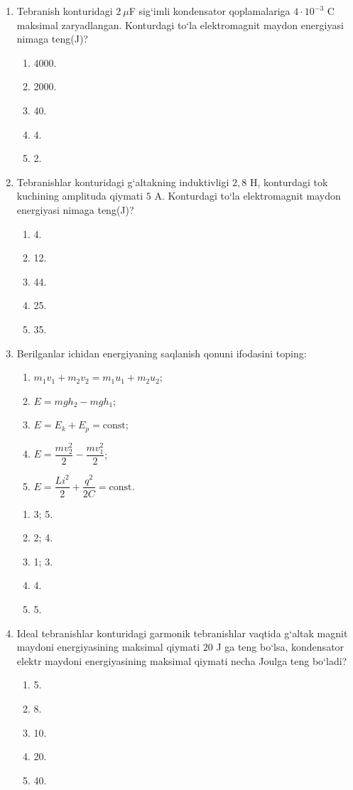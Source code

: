 \begin{enumerate}
\item Tebranish konturidagi $2~\mu$F sig‘imli kondensator qoplamalariga $4\cdot10^{-3}$ C maksimal zaryadlangan. Konturdagi to‘la elektromagnit maydon energiyasi nimaga teng(J)?
\begin{enumerate}[label=\Alph*)]
\item 4000.
\item 2000.
\item 40.
\item 4.
\item 2.
\end{enumerate}

\item Tebranishlar konturidagi g‘altakning induktivligi $2,8$ H, konturdagi tok kuchining amplituda qiymati $5$ A. Konturdagi to‘la elektromagnit maydon energiyasi nimaga teng(J)?
\begin{enumerate}[label=\Alph*)]
\item 4.
\item 12.
\item 44.
\item 25.
\item 35.
\end{enumerate}

\item Berilganlar ichidan energiyaning saqlanish qonuni ifodasini toping:
\begin{enumerate}
\item $m_1v_1+m_2v_2=m_1u_1+m_2u_2$;
\item $E=mgh_2-mgh_1$;
\item $E=E_k+E_p=\mathrm{const}$;
\item $E=\dfrac{mv_2^2}{2}-\dfrac{mv_1^2}{2}$;
\item $E=\dfrac{Li^2}{2}+\dfrac{q^2}{2C}=\mathrm{const}$.
\end{enumerate}
\begin{enumerate}[label=\Alph*)]
\item 3; 5.
\item 2; 4.
\item 1; 3.
\item 4.
\item 5.
\end{enumerate}

\item Ideal tebranishlar konturidagi garmonik tebranishlar vaqtida g‘altak magnit maydoni energiyasining maksimal qiymati $20$ J ga teng bo‘lsa, kondensator elektr maydoni energiyasining maksimal qiymati necha Joulga teng bo‘ladi?
\begin{enumerate}[label=\Alph*)]
\item 5.
\item 8.
\item 10.
\item 20.
\item 40.
\end{enumerate}


\end{enumerate}
